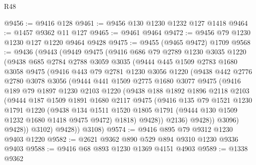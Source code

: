\begin{lexlean}{R48}
\begin{coremodule}
@9456 := @9416 @128
@9461 := @9456 @130 @1230 @1232 @127 @1418
@9464 := @1457 @9362 @11 @127
@9465 := @9461 @9464
@9472 := @9456 @79 @1230 @1230 @127 @1220 @9464 @9428
@9475 := @9455 (@9465 @9472) @1709
@9568 := @9436
    (@9443
      (@9449
        @9475
        (@9416
          @686
          @79
          @2789
          @1230
          @3035
          @1220
          (@9438
            @685
            @2784
            @2788
            @3059
            @3035
            (@9444
              @445
              @1509
              @2783
              @1680
              @3058
              @9475
              (@9416
                @443
                @79
                @2781
                @1230
                @3056
                @1220
                (@9438
                  @442
                  @2776
                  @2780
                  @3078
                  @3056
                  (@9444
                    @441
                    @1509
                    @2775
                    @1680
                    @3077
                    @9475
                    (@9416
                      @189
                      @79
                      @1897
                      @1230
                      @2103
                      @1220
                      (@9438
                        @188
                        @1892
                        @1896
                        @2118
                        @2103
                        (@9444
                          @187
                          @1509
                          @1891
                          @1680
                          @2117
                          @9475
                          (@9416
                            @135
                            @79
                            @1521
                            @1230
                            @1791
                            @1220
                            (@9438
                              @134
                              @1511
                              @1520
                              @1805
                              @1791
                              (@9444 @130 @1509 @1232 @1680 @1418 @9475 @9472)
                              @1818)
                            @9428))
                        @2136)
                      @9428))
                  @3096)
                @9428))
            @3102)
          @9428))
      @3108)
@9574 := @9416 @895 @79 @9312 @1230 @9403 @1220
@9582 := @2621 @9362 @890 @529 @894 @9310 @1230 @9336 @9403
@9588 := @9416 @68 @893 @1230 @1369 @4151 @4903
@9589 := @1338 @9362

\end{coremodule}
\end{lexlean}
